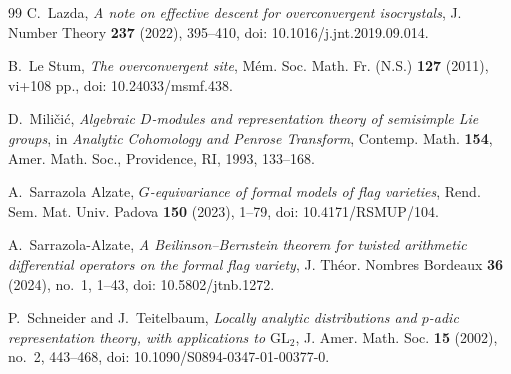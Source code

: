 \documentclass[11pt]{amsart}
\theoremstyle{plain}
\theoremstyle{definition}
\theoremstyle{remark}
\begin{document}
\begin{thebibliography}{99}
C.~Lazda,
\emph{A note on effective descent for overconvergent isocrystals},
J. Number Theory \textbf{237} (2022), 395--410,
doi: 10.1016/j.jnt.2019.09.014.

B.~Le Stum,
\emph{The overconvergent site},
M\'em. Soc. Math. Fr. (N.S.) \textbf{127} (2011), vi+108 pp.,
doi: 10.24033/msmf.438.

D.~Mili\v{c}i\'c,
\emph{Algebraic \(D\)-modules and representation theory of semisimple Lie groups},
in \emph{Analytic Cohomology and Penrose Transform}, Contemp. Math.
\textbf{154}, Amer. Math. Soc., Providence, RI, 1993, 133--168.

A.~Sarrazola Alzate,
\emph{\(G\)-equivariance of formal models of flag varieties},
Rend. Sem. Mat. Univ. Padova \textbf{150} (2023), 1--79,
doi: 10.4171/RSMUP/104.

A.~Sarrazola-Alzate,
\emph{A Beilinson--Bernstein theorem for twisted arithmetic differential operators on the formal flag variety},
J. Th\'eor. Nombres Bordeaux \textbf{36} (2024), no.~1, 1--43,
doi: 10.5802/jtnb.1272.

P.~Schneider and J.~Teitelbaum,
\emph{Locally analytic distributions and \(p\)-adic representation theory, with applications to \(\mathrm{GL}_2\)},
J. Amer. Math. Soc. \textbf{15} (2002), no.~2, 443--468,
doi: 10.1090/S0894-0347-01-00377-0.

\end{thebibliography}
\end{document}

